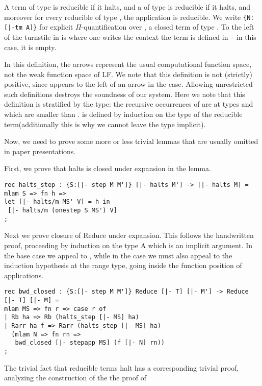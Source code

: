 A term of type  is reducible if it halts, and a  of type
 is reducible if it halts, and moreover for every reducible
 of type , the application  is reducible. We write
\lstinline!{N:[|-tm A]}! for explicit $\Pi$-quantification over , a closed term
of type . To the left of the turnstile in \bel{[|- tm A]} is where one
writes the context the term is defined in -- in this case, it is empty.

In this definition, the arrows represent the usual computational
function space, not the weak function space of LF. We note that this
definition is not (strictly) positive, since  appears to the
left of an arrow in the  case. Allowing unrestricted such
definitions destroys the soundness of our system. Here we note that
this definition is stratified by the type: the recursive occurrences
of  are at types  and  which are smaller than .
 is defined by induction on the type of the reducible
term(additionally this is why we cannot leave the type implicit).

Now, we need to prove some more or less trivial lemmas that are
usually omitted in paper presentations.

First, we prove that halts is closed under expansion in the  lemma.

\begin{lstlisting}
rec halts_step : {S:[|- step M M']} [|- halts M'] -> [|- halts M] =
mlam S => fn h =>
let [|- halts/m MS' V] = h in
 [|- halts/m (onestep S MS') V]
;
\end{lstlisting}

Next we prove closure of Reduce under expansion. This follows the
handwritten proof, proceeding by induction on the type A which is an
implicit argument. In the base case we appeal to , while
in the  case we must also appeal to the induction hypothesis at
the range type, going inside the function position of applications.

\begin{lstlisting}
rec bwd_closed : {S:[|- step M M']} Reduce [|- T] [|- M'] -> Reduce [|- T] [|- M] =
mlam MS => fn r => case r of
| Rb ha => Rb (halts_step [|- MS] ha)
| Rarr ha f => Rarr (halts_step [|- MS] ha)
  (mlam N => fn rn =>
   bwd_closed [|- stepapp MS] (f [|- N] rn))
;
\end{lstlisting}

The trivial fact that reducible terms halt has a corresponding
trivial proof, analyzing the construction of the the proof of


